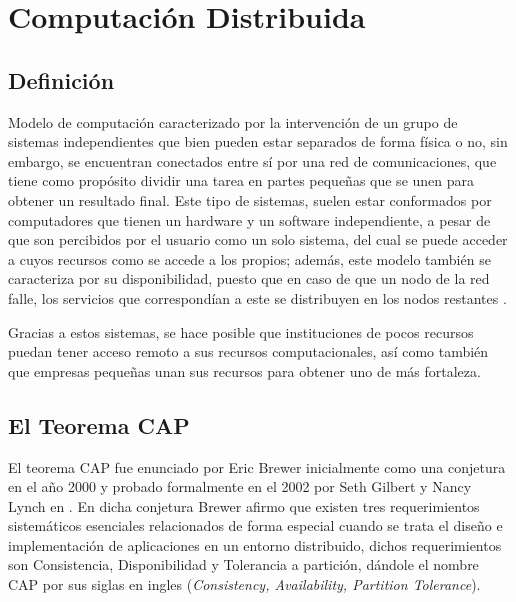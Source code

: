 \section{Computación Distribuida}


\subsection{Definición}

Modelo de computación caracterizado por la intervención de un grupo de sistemas independientes que bien pueden estar separados de forma física o no, sin embargo, se encuentran conectados entre sí por una red de comunicaciones, que tiene como propósito dividir una tarea en partes pequeñas que se unen para obtener un resultado final. Este tipo de sistemas, suelen estar conformados por computadores que tienen un hardware y un software independiente, a pesar de que son percibidos por el usuario como un solo sistema, del cual se puede acceder a cuyos recursos como se accede a los propios; además, este modelo también se caracteriza por su disponibilidad, puesto que en caso de que un nodo de la red falle, los servicios que correspondían a este se distribuyen en los nodos restantes \cite{47dd}.

Gracias a estos sistemas, se hace posible que instituciones de pocos recursos puedan tener acceso remoto a sus recursos computacionales, así como también que empresas pequeñas unan sus recursos para obtener uno de más fortaleza.


\subsection{El Teorema CAP}

El teorema CAP fue enunciado por Eric Brewer inicialmente como una conjetura en el año 2000 y probado formalmente en el 2002 por Seth Gilbert y Nancy Lynch en \cite{brewer}. 
En dicha conjetura Brewer afirmo que existen tres requerimientos sistemáticos esenciales relacionados de forma especial cuando se trata el diseño e implementación de aplicaciones en un entorno distribuido, dichos requerimientos son Consistencia, Disponibilidad y Tolerancia a partición, dándole el nombre CAP por sus siglas en ingles (\emph{Consistency, Availability, Partition Tolerance}).\cite{capt}

